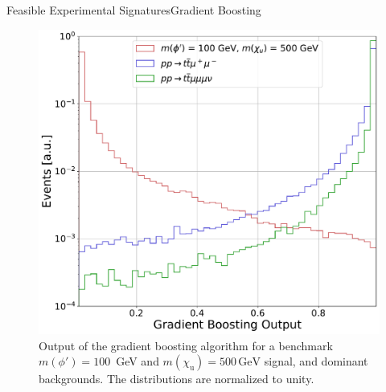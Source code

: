 \documentclass{../bredelebeamer}
\begin{document}
\begin{frame}{Feasible Experimental Signatures}{Gradient Boosting}
	\begin{figure}
	\centering
		\centering  \includegraphics[width=.6\linewidth]{XGB_output.pdf}
		\caption{Output of the gradient boosting algorithm for a benchmark $m(\phi') = 100$~\textrm{GeV} and $m(\chi_\mathrm{u}) = 500\, \mathrm{GeV}$ signal, and dominant backgrounds. The distributions are normalized to unity.}
		\label{fig:xgboostout}
	\end{figure}
\end{frame}
\end{document}
